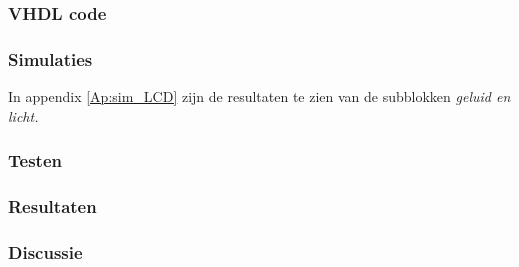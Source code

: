 \subsubsection{VHDL code}

\subsubsection{Simulaties}
In appendix \ref{Ap:sim_LCD} zijn de resultaten te zien van de subblokken \it{geluid} en \it{licht}.

\subsubsection{Testen}

\subsubsection{Resultaten}

\subsubsection{Discussie}